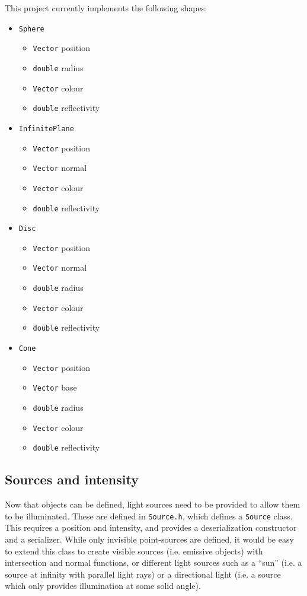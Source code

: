\documentclass[a4paper]{article}
\begin{document}
This project currently implements the following shapes:
\begin{itemize}
  \item \verb|Sphere|
  \begin{itemize}
    \item \verb|Vector| position
    \item \verb|double| radius
    \item \verb|Vector| colour
    \item \verb|double| reflectivity
  \end{itemize}
  \item \verb|InfinitePlane|
  \begin{itemize}
    \item \verb|Vector| position
    \item \verb|Vector| normal
    \item \verb|Vector| colour
    \item \verb|double| reflectivity
  \end{itemize}
  \item \verb|Disc|
  \begin{itemize}
    \item \verb|Vector| position
    \item \verb|Vector| normal
    \item \verb|double| radius
    \item \verb|Vector| colour
    \item \verb|double| reflectivity
  \end{itemize}
  \item \verb|Cone|
  \begin{itemize}
    \item \verb|Vector| position
    \item \verb|Vector| base
    \item \verb|double| radius
    \item \verb|Vector| colour
    \item \verb|double| reflectivity
  \end{itemize}
\end{itemize}

\subsection{Sources and intensity}
Now that objects can be defined, light sources need to be provided to allow them to be illuminated. These are defined in \verb|Source.h|, which defines a \verb|Source| class. This requires a position and intensity, and provides a deserialization constructor and a serializer. While only invisible point-sources are defined, it would be easy to extend this class to create visible sources (i.e. emissive objects) with intersection and normal functions, or different light sources such as a ``sun'' (i.e. a source at infinity with parallel light rays) or a directional light (i.e. a source which only provides illumination at some solid angle). 
\end{document}
